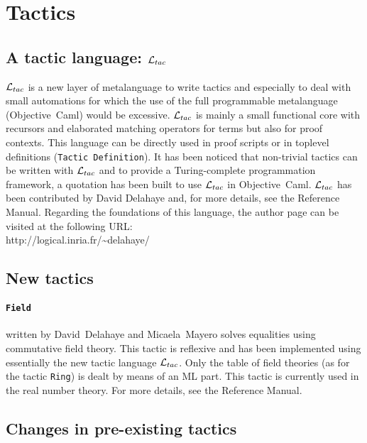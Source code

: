 \documentclass[11pt]{article}
\begin{document}
\section{Tactics}
\label{Tactics}
\def\oc{{\sf Objective~Caml}}

\subsection{A tactic language: ${\cal L}_{tac}$}

${\cal L}_{tac}$ is a new layer of metalanguage to write tactics and especially to deal
with small automations for which the use of the full programmable metalanguage
(\oc{}) would be excessive. ${\cal L}_{tac}$ is mainly a small functional core with
recursors and elaborated matching operators for terms but also for proof
contexts. This language can be directly used in proof scripts or in toplevel
definitions ({\tt Tactic~Definition}). It has been noticed that non-trivial
tactics can be written with ${\cal L}_{tac}$ and to provide a Turing-complete
programmation framework, a quotation has been built to use ${\cal L}_{tac}$ in \oc{}.
${\cal L}_{tac}$ has been contributed by David Delahaye and, for more details, see the
Reference Manual. Regarding the foundations of this language, the author page
can be visited at the following URL:\\

{\sf http://logical.inria.fr/\~{}delahaye/}

\subsection{New tactics}
\label{NewTactics}
\def\ml{{\sf ML}}

   \paragraph{{\tt Field}} written by David~Delahaye and Micaela~Mayero solves
equalities using commutative field theory. This tactic is reflexive and has
been implemented using essentially the new tactic language ${\cal L}_{tac}$. Only the
table of field theories (as for the tactic {\tt Ring}) is dealt by means of an
\ml{} part. This tactic is currently used in the real number theory. For more
details, see the Reference Manual.

\subsection{Changes in pre-existing tactics}
\label{TacticChanges}
\end{document}
